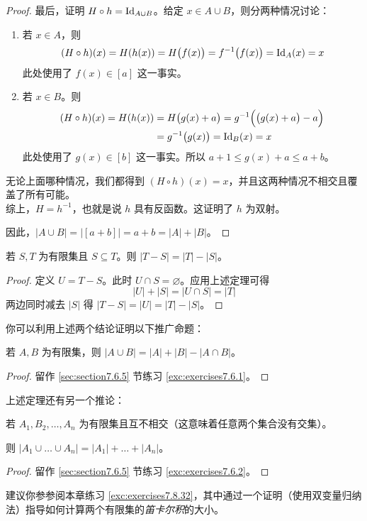 \begin{proof}
    最后，证明 $H \circ h = \text{Id}_{A \cup B}$。给定 $x \in A \cup B$，则分两种情况讨论：
    \begin{enumerate}[label=(\arabic*)]
        \item 若 $x \in A$，则
            \[(H \circ h)(x) = H(h(x)) = H\big(f(x)\big) = f^{-1}\big(f(x)\big) = \text{Id}_A(x) = x\]
           此处使用了 $f(x) \in [a]$ 这一事实。
        \item 若 $x \in B$。则
        \begin{align*}
            (H \circ h)(x) = H(h(x)) &= H\big(g(x)+a\big) = g^{-1}\Big(\big(g(x)+a\big)-a\Big)\\
            &= g^{-1}\big(g(x)\big) = \text{Id}_B(x) = x
        \end{align*}
            此处使用了 $g(x) \in [b]$ 这一事实。所以 $a + 1 \le g(x) + a \le a + b$。
    \end{enumerate}
    无论上面哪种情况，我们都得到 $(H \circ h)(x) = x$，并且这两种情况不相交且覆盖了所有可能。\\

    综上，$H = h^{-1}$，也就是说 $h$ 具有反函数。这证明了 $h$ 为双射。

    因此，$|A \cup B| = |[a + b]| = a + b = |A| + |B|$。
\end{proof}

\begin{corollary}
    若 $S,T$ 为有限集且 $S \subseteq T$。则 $|T-S| = |T|-|S|$。
\end{corollary}

\begin{proof}
    定义 $U = T - S$。此时 $U \cap S = \varnothing$。应用上述定理可得
    \[|U| + |S| = |U \cap S| = |T|\]
    两边同时减去 $|S|$ 得 $ |T - S| = |U| = |T| - |S|$。
\end{proof}

你可以利用上述两个结论证明以下推广命题：

\begin{proposition}\label{prop:proposition7.6.9}
    若 $A,B$ 为有限集，则 $|A \cup B| = |A| + |B| - |A \cap B|$。
\end{proposition}

\begin{proof}
    留作 \ref{sec:section7.6.5} 节练习 \ref{exc:exercises7.6.1}。
\end{proof}

上述定理还有另一个推论：

\begin{corollary}\label{corollary7.6.10}
    若 $A_1,B_2,\dots,A_n$ 为有限集且互不相交（这意味着任意两个集合没有交集）。

    则 $|A_1 \cup \dots \cup A_n| = |A_1| + \dots + |A_n|$。
\end{corollary}

\begin{proof}
    留作 \ref{sec:section7.6.5} 节练习 \ref{exc:exercises7.6.2}。
\end{proof}

建议你参参阅本章练习 \ref{exc:exercises7.8.32}，其中通过一个证明（使用双变量归纳法）指导如何计算两个有限集的\emph{笛卡尔积}的大小。
